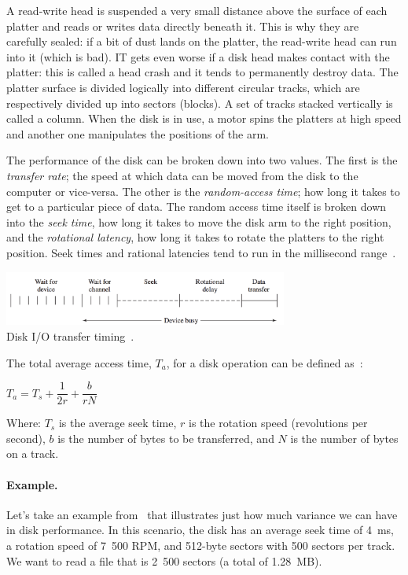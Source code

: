 A read-write head is suspended a very small distance above the surface of each platter and reads or writes data directly beneath it. This is why they are carefully sealed: if a bit of dust lands on the platter, the read-write head can run into it (which is bad). IT gets even worse if a disk head makes contact with the platter: this is called a head crash and it tends to permanently destroy data. The platter surface is divided logically into different circular tracks, which are respectively divided up into sectors (blocks). A set of tracks stacked vertically is called a column. When the disk is in use, a motor spins the platters at high speed and another one manipulates the positions of the arm.

The performance of the disk can be broken down into two values. The first is the \textit{transfer rate}; the speed at which data can be moved from the disk to the computer or vice-versa. The other is the \textit{random-access time}; how long it takes to get to a particular piece of data. The random access time itself is broken down into the \textit{seek time}, how long it takes to move the disk arm to the right position, and the \textit{rotational latency}, how long it takes to rotate the platters to the right position. Seek times and rational latencies tend to run in the millisecond range~\cite{osc}.

\begin{center}
	\includegraphics[width=0.7\textwidth]{images/disk-transfer-time.png}\\
	Disk I/O transfer timing~\cite{osi}.
\end{center}

The total average access time, $T_{a}$, for a disk operation can be defined as~\cite{osi}:

\begin{center}
$T_{a} = T_{s} + \dfrac{1}{2r} + \dfrac{b}{rN}$
\end{center}
Where: $T_{s}$ is the average seek time, $r$ is the rotation speed (revolutions per second), $b$ is the number of bytes to be transferred, and $N$ is the number of bytes on a track.

\paragraph{Example.} Let's take an example from~\cite{osi} that illustrates just how much variance we can have in disk performance. In this scenario, the disk has an average seek time of 4~ms, a rotation speed of 7~500 RPM, and 512-byte sectors with 500 sectors per track. We want to read a file that is 2~500 sectors (a total of 1.28~MB). 


